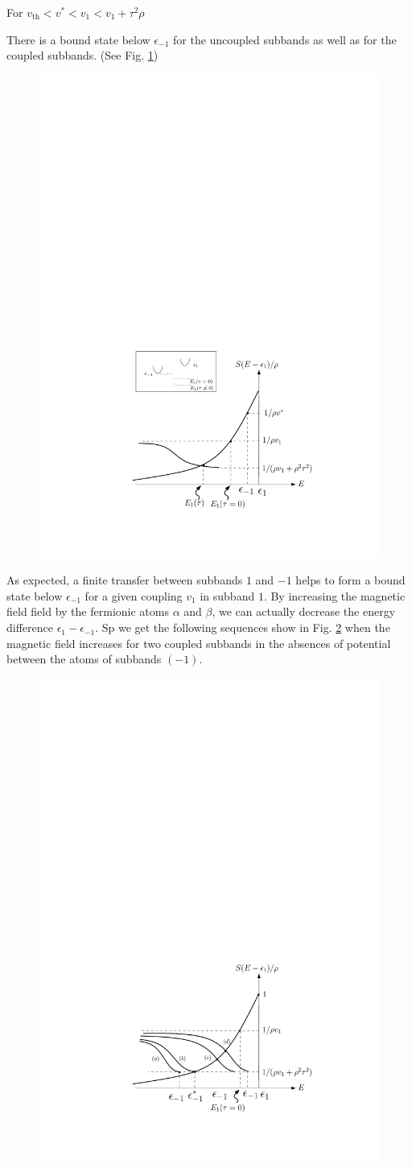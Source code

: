 \documentclass[11pt]{article} %
\begin{document}
For $v_{\text{th}}<v^{*}<v_1<v_1+\tau^2\rho$

There is a bound state below $\epsilon_{-1}$ for the uncoupled subbands as well as for the  coupled subbands.  (See Fig. \ref{fig:bound2})

\begin{figure}[htb]
	\centering
	       \includegraphics[width=.6\textwidth]{bound2}
			\caption{\label{fig:bound2}}
\end{figure}

As expected, a finite transfer between subbands $1$ and $-1$ helps to form a bound state below $\epsilon_{-1}$ for a given coupling $v_{1}$ in subband $1$. By increasing the magnetic field field by the fermionic atoms $\alpha$ and $\beta$, we can actually decrease the energy difference $\epsilon_{1}-\epsilon_{-1}$. Sp we get the following sequences show in Fig. \ref{fig:seqS} when the magnetic field increases for two coupled subbands in the absences of potential between the atoms of subbands $(-1)$.
\begin{figure}[htb]
	\centering
	       \includegraphics[width=.6\textwidth]{seqS}
			\caption{\label{fig:seqS}}
\end{figure}
\end{document}
